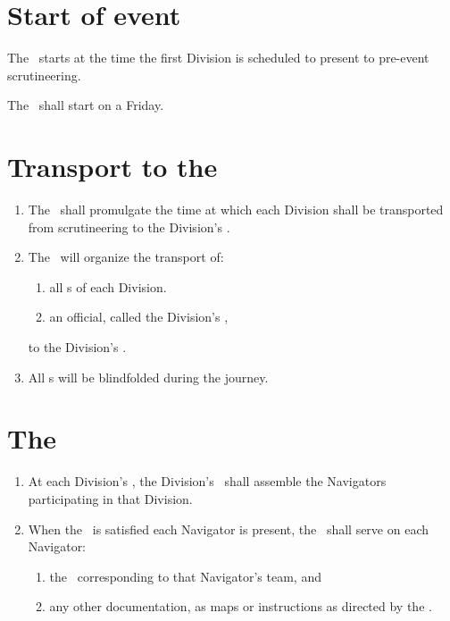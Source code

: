 \documentclass[12pt]{report}
\begin{document}
  \section{Start of event}
  \begin{fenumerate}
    \item The \Event\ starts at the time the first Division is scheduled to present to pre-event scrutineering.
    \item The \Event\ shall start on a Friday.
  \end{fenumerate}
  \section{Transport to the \dropoffpoint}
  \begin{enumerate}
    \item The \RaceDirector\ shall promulgate the time at which each Division shall be transported from scrutineering to the Division's \dropoffpoint.
    \item The \RaceDirector\ will organize the transport of:
    \begin{enumerate}
     \item all \competitor s of each Division.
     \item an official, called the Division's \LeadDriver,
    \end{enumerate}
     to the Division's \dropoffpoint.
     \item All \competitor s will be blindfolded during the journey.\amended
  \end{enumerate}
  \section{The \dropoffpoint}
  \begin{enumerate}
    \item At each Division's \dropoffpoint, the Division's \LeadDriver\ shall assemble the Navigators participating in that Division.
    \item When the \LeadDriver\ is satisfied each Navigator is present, the \LeadDriver\ shall serve on each Navigator:
        \begin{enumerate}
          \item the \TeamEnvelope\ corresponding to that Navigator's team, and
          \item any other documentation, as maps or instructions as directed by the \RaceDirector.
          \end{enumerate}
          \amended
  \end{enumerate}
\end{document}
